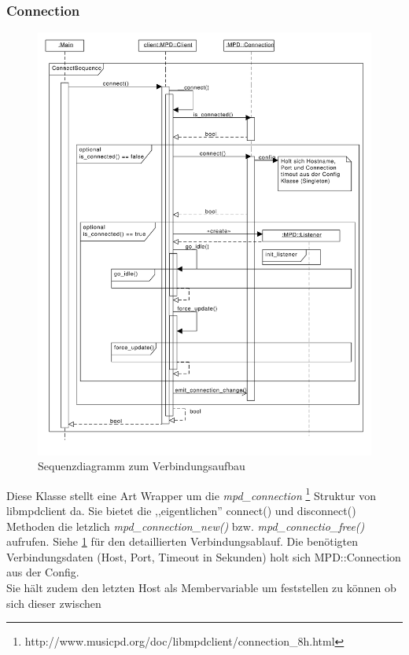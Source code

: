 \subsubsection{Connection}
\begin{figure}[htb!]
	\centering
        \includegraphics[scale=0.5]{./gfx/seq/connect}
	\caption{Sequenzdiagramm zum Verbindungsaufbau}
	\label{client_seq_connect}
\end{figure}
Diese Klasse stellt eine Art Wrapper um die \textit{mpd\_connection}
\footnote{http://www.musicpd.org/doc/libmpdclient/connection\_8h.html} Struktur von libmpdclient da.
Sie bietet die ,,eigentlichen'' connect() und disconnect() Methoden die letzlich \textit{mpd\_connection\_new()} bzw. \textit{mpd\_connectio\_free()} aufrufen. Siehe \ref{client_seq_connect} für den detaillierten Verbindungsablauf.
Die benötigten Verbindungsdaten (Host, Port, Timeout in Sekunden) holt sich MPD::Connection aus der Config.
\\
Sie hält zudem den letzten Host als Membervariable um feststellen zu können ob sich dieser zwischen 

